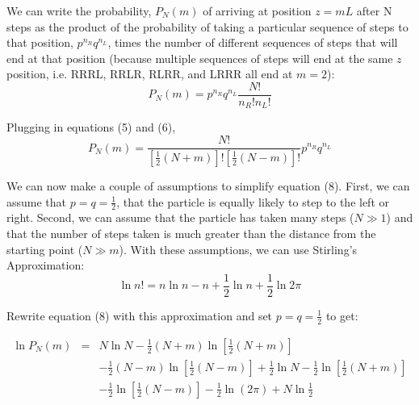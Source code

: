 \documentclass[draft, jgrga]{AGUTeX}
\begin{document}
\begin{article}
We can write the probability, \begin{math} P_N(m) \end{math} of arriving at position \begin{math} z = mL \end{math} after N steps as the product of the probability of taking a particular sequence of steps to that position, \begin{math} p^{n_R} q^{n_L} \end{math}, times the number of different sequences of steps that will end at that position (because multiple sequences of steps will end at the same $z$ position, i.e. RRRL, RRLR, RLRR, and LRRR all end at \begin{math} m=2 \end{math}):
\begin{equation}
P_N(m) = p^ {n_R} q^ {n_L} \frac{N!}{n_R! n_L!}
\end{equation}

Plugging in equations (5) and (6),
\begin{equation}
P_N(m) = \frac{N!}{[\frac{1}{2}(N+m)]![\frac{1}{2}(N-m)]!} p^{n_R}q^{n_L}
\end{equation}

We can now make a couple of assumptions to simplify equation (8). First, we can assume that \begin{math} p=q= \frac{1}{2} \end{math}, that the particle is equally likely to step to the left or right. Second, we can assume that the particle has taken many steps (\begin{math} N \gg 1 \end{math}) and that the number of steps taken is much greater than the distance from the starting point (\begin{math} N \gg m \end{math}). With these assumptions, we can use Stirling's Approximation:
\begin{equation}
\ln n! = n \ln n - n + \frac{1}{2} \ln n + \frac{1}{2} \ln 2 \pi
\end{equation}

Rewrite equation (8) with this approximation and set \begin{math} p = q= \frac{1}{2} \end{math} to get:

\begin{eqnarray}
\ln P_N(m) & = & N \ln N - \frac{1}{2} (N+m) \ln [\frac{1}{2}(N+m)] \nonumber \\
& & - \frac{1}{2}(N - m) \ln[\frac{1}{2}(N-m)]+\frac{1}{2}\ln N - \frac{1}{2}\ln
[\frac{1}{2}(N+m)] \\
& & - \frac{1}{2} \ln[\frac{1}{2}(N-m)]- \frac{1}{2} \ln(2 \pi) + N \ln \frac{1}{2} \nonumber
\end{eqnarray}


\end{article}
\end{document}
